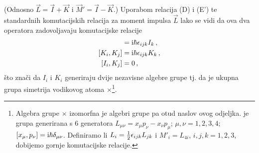 (Odnosno $\vec{L} = \vec{I} + \vec{K}$ i
$\vec{M}' =  \vec{I} - \vec{K}$.)
Uporabom relacija (D) i (E') te standardnih komutacijskih
relacija za moment impulsa $\vec{L}$ lako se vidi da ova 
dva operatora zadovoljavaju komutacijske relacije
\begin{align}
[I_i, I_j] &= \rmi \hbar \epsilon_{ijk}  I_k \,, \\
[K_i, K_j] &= \rmi \hbar \epsilon_{ijk}  K_k \,,\\
[I_i, K_j] &= 0 \,,
\end{align}
što znači da $I_i$ i $K_i$ generiraju dvije nezavisne
algebre grupe  tj. da je ukupna grupa simetrija vodikovog
atoma $\times$\footnote{Algebra grupe
$\times$ izomorfna je algebri grupe  pa otud naslov ovog odjeljka. 
 je grupa generirana s 6 
generatora $L_{\mu\nu}=x_\mu p_\nu - x_\nu p_\mu$; $\mu, \nu = 1,2,3,4$;
$[x_\mu, p_\nu] = \textrm{i}\hbar \delta_{\mu\nu}$. Definiramo li
$L_i = \frac{1}{2} \epsilon_{ijk} L_{jk}$ i $M'_i = L_{4i}$, $i,j,k = 1,2,3$,
dobijemo gornje komutacijske relacije.}.

